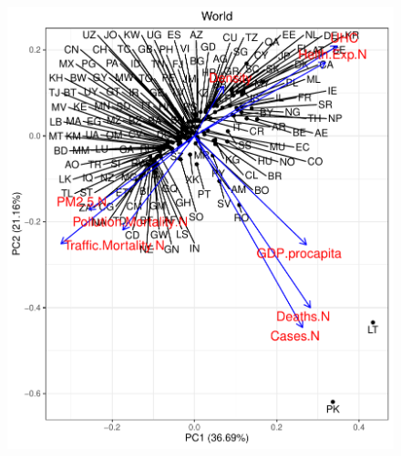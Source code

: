 \documentclass[compress]{beamer}
\begin{document}
\begin{frame}
\begin{figure}[H]
\begin{minipage}{.5\textwidth}
  \includegraphics[width=\linewidth,]{Pic/World_FULLPCA.pdf}
\end{minipage}
\end{figure}
\end{frame}
\end{document}
